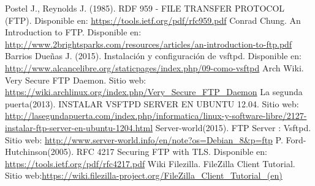 \def\bibname{\centerline{Referencias}}

\begin{thebibliography}{99}
	 Postel J., Reynolds J. (1985). RDF 959 - FILE TRANSFER PROTOCOL (FTP). Disponible en: \url{https://tools.ietf.org/pdf/rfc959.pdf}
	 Conrad Chung. An Introduction to FTP. Disponible en: \url{http://www.2brightsparks.com/resources/articles/an-introduction-to-ftp.pdf}
	 Barrios Dueñas J. (2015). Instalación y configuración de vsftpd. Disponible en: \url{http://www.alcancelibre.org/staticpages/index.php/09-como-vsftpd}
	 Arch Wiki. Very Secure FTP Daemon. Sitio web: \url{https://wiki.archlinux.org/index.php/Very_Secure_FTP_Daemon}
	 La segunda puerta(2013). INSTALAR VSFTPD SERVER EN UBUNTU 12.04. Sitio web: \url{http://lasegundapuerta.com/index.php/informatica/linux-y-software-libre/2127-instalar-ftp-server-en-ubuntu-1204.html}
	 Server-world(2015). FTP Server : Vsftpd. Sitio web: \url{http://www.server-world.info/en/note?os=Debian_8&p=ftp}
	 P. Ford-Hutchinson(2005). RFC 4217 Securing FTP with TLS. Disponible en: \url{https://tools.ietf.org/pdf/rfc4217.pdf}
	 Wiki Filezilla. FileZilla Client Tutorial. Sitio web:\url{https://wiki.filezilla-project.org/FileZilla_Client_Tutorial_(en)}
\end{thebibliography}

